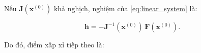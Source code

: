 





Nếu $\mathbf{J}(\mathbf{x}^{(0)})$ khả nghịch, nghiệm của \eqref{eq:linear_system} là:

\begin{equation}
    \mathbf{h} = -\mathbf{J}^{-1}\!\left(\mathbf{x}^{(0)}\right)\, \mathbf{F}\!\left(\mathbf{x}^{(0)}\right).
    \label{eq:h_solution}
\end{equation}

Do đó, điểm xấp xỉ tiếp theo là:

